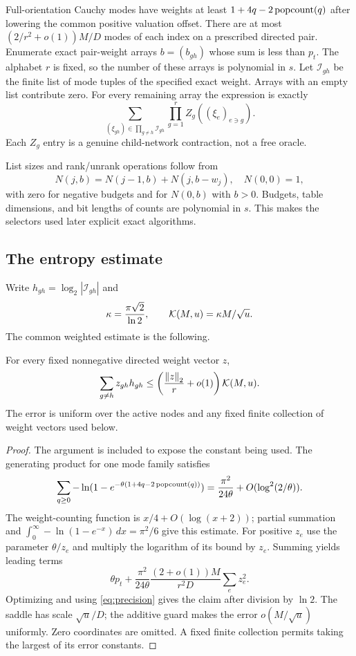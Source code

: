 Full-orientation Cauchy modes have weights at least
$1+4q-2\operatorname{popcount}(q)$ after lowering the common positive valuation offset. There
are at most $(2/r^2+o(1))M/D$ modes of each index on a prescribed directed
pair. Enumerate exact pair-weight arrays $b=(b_{gh})$ whose sum is less
than $p_t$. The alphabet $r$ is fixed, so the number of these arrays is
polynomial in $s$. Let $\mathcal I_{gh}$ be the finite list of mode tuples
of the specified exact weight. Arrays with an empty list contribute zero.
For every remaining array the expression is exactly
\begin{equation}\label{eq:groupidentity}
 \sum_{(\xi_{gh})\in\prod_{g\ne h}\mathcal I_{gh}}
    \prod_{g=1}^r Z_g((\xi_e)_{e\ni g}).
\end{equation}
Each $Z_g$ entry is a genuine child-network contraction, not a free oracle.

List sizes and rank/unrank operations follow from
\[
 N(j,b)=N(j-1,b)+N(j,b-w_j),\quad N(0,0)=1,
\]
with zero for negative budgets and for $N(0,b)$ with $b>0$. Budgets,
table dimensions, and bit lengths of counts are polynomial in $s$.
This makes the selectors used later explicit exact algorithms.

\subsection{The entropy estimate}
Write $h_{gh}=\log_2|\mathcal I_{gh}|$ and
\[
 \kappa=\frac{\pi\sqrt2}{\ln2},\qquad
 \mathcal K(M,u)=\kappa M/\sqrt u.
\]
The common weighted estimate is the following.

\begin{lemma}\label{lem:entropy}
For every fixed nonnegative directed weight vector $z$,
\[
 \sum_{g\ne h}z_{gh}h_{gh}
 \le\left(\frac{\left\lVert z\right\rVert_2}{r}+o(1)\right)\mathcal K(M,u).
\]
The error is uniform over the active nodes and any fixed finite collection
of weight vectors used below.
\end{lemma}
\begin{proof}
The argument is included to expose the constant being used. The generating
product for one mode family satisfies
\[
 \sum_{q\ge0}-\ln(1-e^{-\theta(1+4q-2\operatorname{popcount}(q))})
   =\frac{\pi^2}{24\theta}+O(\log^2(2/\theta)).
\]
The weight-counting function is $x/4+O(\log(x+2))$; partial summation and
$\int_0^\infty-\ln(1-e^{-x})\,dx=\pi^2/6$ give this estimate.
For positive $z_e$ use the parameter $\theta/z_e$ and multiply the
logarithm of its bound by $z_e$. Summing yields leading terms
\[
 \theta p_t+\frac{\pi^2}{24\theta}
              \frac{(2+o(1))M}{r^2D}\sum_ez_e^2.
\]
Optimizing and using \eqref{eq:precision} gives the claim after division
by $\ln2$. The saddle has scale $\sqrt u/D$; the additive guard makes the
error $o(M/\sqrt u)$ uniformly. Zero coordinates are omitted. A fixed
finite collection permits taking the largest of its error constants.
\end{proof}

